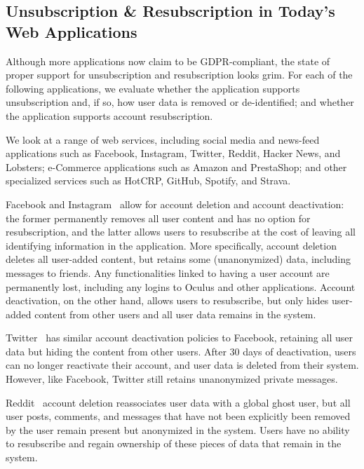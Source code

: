 \subsection{Unsubscription \& Resubscription in Today's Web Applications}

Although more applications now claim to be GDPR-compliant, the state of proper support for
unsubscription and resubscription looks grim.  For each of the following applications, we evaluate
whether the application supports unsubscription and, if so, how user data is removed or
de-identified; and whether the application supports account resubscription.

We look at a range of web services, including social media and news-feed applications such as
Facebook, Instagram, Twitter, Reddit, Hacker News, and Lobsters; e-Commerce
applications such as Amazon and PrestaShop; and other specialized services such as HotCRP, GitHub, Spotify, and Strava.


Facebook and Instagram~\cite{facebook:privacy} allow for account deletion and account deactivation:
the former permanently removes all user content and has no option for resubscription, and the latter
allows users to resubscribe at the cost of leaving all identifying information in the application.
More specifically, account deletion deletes all user-added content, but retains some (unanonymized)
data, including messages to friends. Any functionalities linked to having a user account are permanently lost,
including any logins to Oculus and other applications. Account deactivation, on the other hand,
allows users to resubscribe, but only hides user-added content from other users and all user data
remains in the system. 

Twitter~\cite{twitter:privacy} has similar account deactivation policies to Facebook, retaining all
user data but hiding the content from other users. After 30 days of deactivation, users can no
longer reactivate their account, and user data is deleted from their system.  However, like
Facebook, Twitter still retains unanonymized private messages.

Reddit~\cite{reddit:privacy} account deletion reassociates user data with a global ghost user, but
all user posts, comments, and messages that have not been explicitly been removed by the user remain
present but anonymized in the system. Users have no ability to resubscribe and regain
ownership of these pieces of data that remain in the system. 

